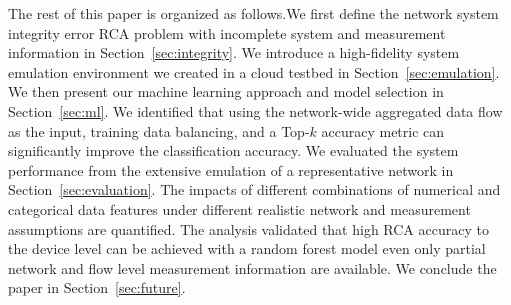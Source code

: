 The rest of this paper is organized as follows.We first define the network system integrity error RCA problem with incomplete system and measurement information in Section~\ref{sec:integrity}. We introduce a high-fidelity system emulation environment we created in a cloud testbed in Section~\ref{sec:emulation}. We then present our machine learning approach and model selection in Section~\ref{sec:ml}. We identified that using the network-wide aggregated data flow as the input, training data balancing, and a Top-$k$ accuracy metric can significantly improve the classification accuracy. We evaluated the system performance from the extensive emulation of a representative network in Section~\ref{sec:evaluation}. The impacts of different combinations of numerical and categorical data features under different realistic network and measurement assumptions are quantified. The analysis validated that high RCA accuracy to the device level can be achieved with a random forest model even only partial network and flow level measurement information are available. We conclude the paper in Section~\ref{sec:future}.
